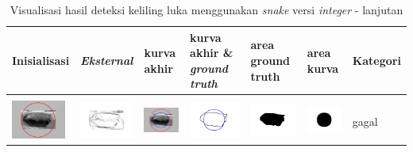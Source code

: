 \begin{table}[H]
	\centering
	\caption{Visualisasi hasil deteksi keliling luka menggunakan \emph{snake} versi \emph{integer} - lanjutan}
	\label{tabel_hasil_3}
	\begin{tabular}{|m{0.7in}|m{0.7in}|m{0.7in}|m{0.7in}|m{0.7in}|m{0.7in}|m{0.7in}|}
		\hline
		\textbf{Inisialisasi} & \textbf{\emph{Eksternal}} & \textbf{kurva akhir} & \textbf{kurva akhir \& \emph{ground truth}}& \textbf{area ground truth} & \textbf{area kurva} & \textbf{Kategori} \\
		\hline
		
		&  &  & & & &  \\
		\includegraphics[width=0.7in]{dataset/dataset_3/luka_hitam/ready/22_integer_init.jpg}&
		\includegraphics[width=0.7in]{dataset/dataset_3/luka_hitam/ready/22_integer_ext.jpg}&
		\includegraphics[width=0.7in]{dataset/dataset_3/luka_hitam/ready/22_integer_result.jpg}&
		\includegraphics[width=0.7in]{dataset/dataset_3/luka_hitam/ready/22_gt_r_integer.jpg}&
		\includegraphics[width=0.7in]{dataset/dataset_3/luka_hitam/ready/22_r.jpg}&
		\includegraphics[width=0.7in]{dataset/dataset_3/luka_hitam/ready/22_integer_r.jpg}&
		gagal\\
		\hline
		

\end{tabular}
\end{table}
